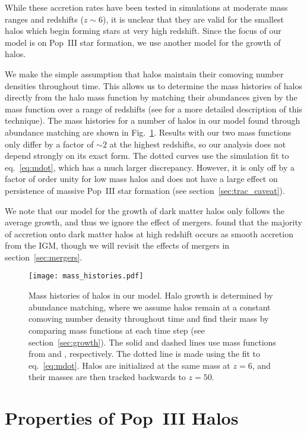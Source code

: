 \documentclass[a4paper,fleqn,usenatbib]{mnras}
\begin{document}
While these accretion rates have been tested in simulations at moderate mass ranges and redshifts ($z \sim 6$), it is unclear that they are valid for the smallest halos which begin forming stars at very high redshift. Since the focus of our model is on Pop~III star formation, we 
use another model for the growth of halos.

We make the simple assumption that halos maintain their comoving number densities throughout time. This allows us to determine the mass histories of halos directly from the halo mass function by matching their abundances given by the mass function over a range of redshifts (see \citealt{furlanetto_2016} for a more detailed description of this technique). The mass histories for a number of halos in our model found through abundance matching are shown in Fig.~\ref{fig:mass_histories}.
Results with our two mass functions only differ by a factor of $\sim 2$ at the highest redshifts, so our analysis does not depend strongly on 
its exact form. 
The dotted curves use the \citet{trac_2015} simulation fit to eq.~\ref{eq:mdot}, which has a much larger discrepancy. However, 
it is only off by a factor of order unity for low mass halos and does not have a large effect on persistence of massive Pop~III star formation (see section~\ref{sec:trac_caveat}).

We note that our model for the growth of dark matter halos only follows the average growth, and thus we ignore the effect of mergers. \citet{behroozi_2015} found that the majority of accretion onto dark matter halos at high redshift occurs as smooth accretion from the IGM, though we will 
revisit the effects of mergers in section~\ref{sec:mergers}.

\begin{figure}
	\texttt{[image: mass\_histories.pdf]}
    \caption{Mass histories of halos in our model. Halo growth is determined by abundance matching, where we assume halos remain at a constant comoving number density throughout time and find their mass by comparing mass functions at each time step (see section~\ref{sec:growth}). The solid and dashed lines 
    use mass functions from \citet{sheth_tormen} and \citet{trac_2015}, respectively.
    The dotted line is made using the \citet{trac_2015} fit to eq.~\ref{eq:mdot}. 
    Halos are initialized at the same mass at $z=6$, and their masses are then tracked backwards to $z=50$.     }
    \label{fig:mass_histories}
\end{figure}

\section{Properties of Pop~III Halos}
\label{sec:III}
\end{document}
